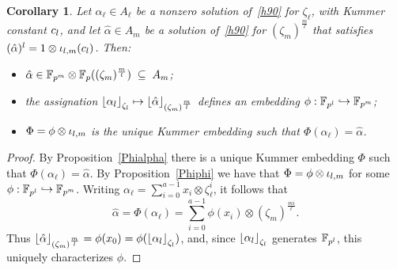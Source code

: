 \documentclass[sigconf]{acmart}
\newtheorem{corollary}[theorem]{Corollary}
\begin{document}
\begin{corollary}
\label{alphaphi}
Let $\alpha_\ell\in A_\ell$ be a nonzero solution of~\eqref{h90} for $\zeta_\ell$,
with Kummer constant $c_l$, and
let $\hat{\alpha}\in A_m$ be a solution of~\eqref{h90} for $(\zeta_m)^{\frac{m}{\ell}}$
that satisfies $(\hat{\alpha})^l=1\otimes{\iota_{{l},{m}}}(c_l)$.
Then:
\begin{itemize}
\item
  $\hat{\alpha}\in\mathbb{F}_{p^m}\otimes\mathbb{F}_{p}((\zeta_m)^{\frac{m}{l}})\;\subseteq\;A_m$;
\item the assignation $\left\lfloor \alpha_{l} \right\rfloor_{\zeta_l}\mapsto\left\lfloor \hat{\alpha} \right\rfloor_{(\zeta_m)^{\frac{m}{l}}}$
defines an embedding $\phi:\mathbb{F}_{p^l}\hookrightarrow\mathbb{F}_{p^m}$;
\item $\Phi=\phi\otimes{\iota_{{l},{m}}}$ is the unique Kummer embedding such that $\Phi(\alpha_\ell)=\hat{\alpha}$.
\end{itemize}
\end{corollary}
\begin{proof}
By Proposition~\ref{Phialpha} there is a unique Kummer embedding $\Phi$ such that $\Phi(\alpha_\ell)=\hat{\alpha}$.
By Proposition~\ref{Phiphi} we have that $\Phi=\phi\otimes{\iota_{{l},{m}}}$ for some $\phi:\mathbb{F}_{p^l}\hookrightarrow\mathbb{F}_{p^m}$.
Writing $\alpha_\ell=\sum_{i=0}^{a-1}x_i\otimes\zeta_{\ell}^i$,
it follows that \[ \hat{\alpha}=\Phi(\alpha_\ell)=\sum_{i=0}^{a-1}\phi(x_i)\otimes(\zeta_m)^{\frac{mi}{\ell}}. \]
Thus $\left\lfloor \hat{\alpha} \right\rfloor_{(\zeta_m)^{\frac{m}{l}}}=\phi(x_0)=\phi(\left\lfloor \alpha_{l} \right\rfloor_{\zeta_l})$,
and, since $\left\lfloor \alpha_{l} \right\rfloor_{\zeta_l}$ generates $\mathbb{F}_{p^l}$, this uniquely characterizes $\phi$.
\end{proof}
\end{document}
